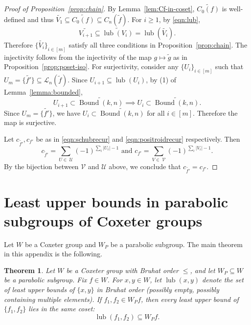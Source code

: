 \documentclass[12pt,reqno]{amsart}
\newtheorem{theorem}[lemma]{Theorem}
\theoremstyle{definition}
\newcommand{\bound}{\operatorname{Bound}}
\newcommand{\lub}{\operatorname{lub}}
\begin{document}
{\begin{proof}[Proof of Proposition~\ref{prop:chain}]
By Lemma~\ref{lem:Cf-in-coset}, $\widetilde{C_0(f)}$ is well-defined and thus $\widetilde{V_1}\subseteq \widetilde{C_0(f)}\subseteq C_n(\widetilde{f})$.
For $i\geq 1$, by \eqref{eqn:lub},
\[\widetilde{V_{i+1}} \subseteq \widetilde{\lub(V_i)} = \lub(\widetilde{V_i}).\]
Therefore $\{\widetilde{V_{i}}\}_{i\in [m]}$ satisfy all three conditions in Proposition~\ref{prop:chain}. The injectivity follows from the injectivity of the map $g\mapsto \widetilde{g}$ as in Proposition~\ref{prop:poset-iso}. For surjectivity, consider any $\{U_i\}_{i\in [m]}$ such that $U_m = \{\widetilde{f'}\}\subseteq \mathcal{L}_n(\widetilde{f})$. Since $U_{i+1}\subseteq \lub(U_{i})$, by (1) of Lemma~\ref{lemma:bounded}, 
\[U_{i+1}\subset \widetilde{\bound(k,n)}\implies U_{i}\subset \widetilde{\bound(k,n)}.\]
Since $U_m = \{\widetilde{f'}\}$, we have $U_i\subset \widetilde{\bound(k,n)}$ for all $i\in [m]$. Therefore the map is surjective. 

Let $c_{\widetilde{f'}},c_{f'}$ be as in \eqref{eqn:schubrecur} and \eqref{eqn:positroidrecur} respectively. Then
\[c_{\widetilde{f}'} = \sum_{U\in\; \mathcal{U}}(-1)^{\sum_{i}|U_i|-1}\text{ and }c_{f'} = \sum_{V\in\; \mathcal{V}}(-1)^{\sum_{i}|V_i|-1}.\]
By the bijection between $\mathcal{V}$ and $\mathcal{U}$ above, we conclude that $c_{\widetilde{f'}} = c_{f'}$.
\end{proof}

\appendix

\section{Least upper bounds in parabolic subgroups of Coxeter groups}

Let $W$ be a Coxeter group and $W_P$ be a parabolic subgroup. The main theorem in this appendix is the following.

\begin{theorem}\label{thm:lub}
Let \(W\) be a Coxeter group with Bruhat order \(\le\), and let \(W_P\subseteq W\) be a parabolic subgroup.
Fix \(f\in W\). For \(x,y\in W\), let \(\lub(x,y)\) denote the set of \emph{least} upper bounds of \(\{x,y\}\)
in Bruhat order (possibly empty, possibly containing multiple elements).
If \(f_1,f_2\in W_P f\), then every least upper bound of \(\{f_1,f_2\}\) lies in the same coset:
\[
\lub(f_1,f_2)\subseteq W_P f.
\]
\end{theorem}



}
\end{document}
